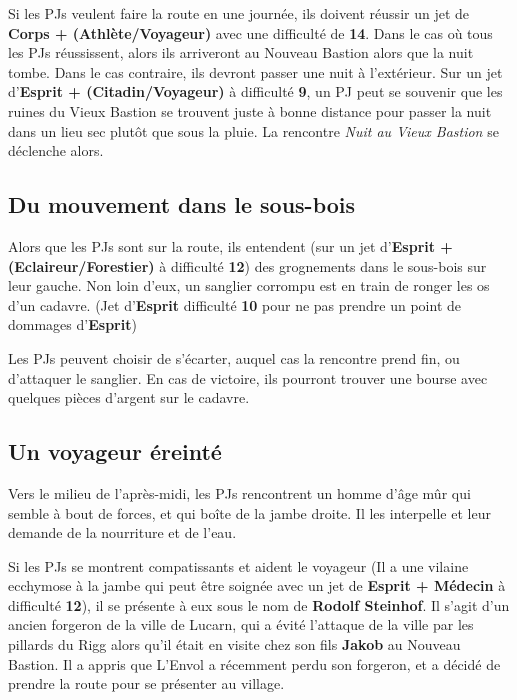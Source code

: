 \documentclass[10pt,twoside,twocolumn,openany,bg=print,justified]{dndbook}
\begin{document}
Si les PJs veulent faire la route en une journée, ils doivent réussir un jet de \textbf{Corps + (Athlète/Voyageur)} avec une difficulté de \textbf{14}. Dans le cas où tous les PJs réussissent, alors ils arriveront au Nouveau Bastion alors que la nuit tombe. Dans le cas contraire, ils devront passer une nuit à l'extérieur. Sur un jet d'\textbf{Esprit + (Citadin/Voyageur)} à difficulté \textbf{9}, un PJ peut se souvenir que les ruines du Vieux Bastion se trouvent juste à bonne distance pour passer la nuit dans un lieu sec plutôt que sous la pluie. La rencontre \textit{Nuit au Vieux Bastion} se déclenche alors.

\subsection*{Du mouvement dans le sous-bois}

Alors que les PJs sont sur la route, ils entendent (sur un jet d'\textbf{Esprit + (Eclaireur/Forestier)} à difficulté \textbf{12}) des grognements dans le sous-bois sur leur gauche. Non loin d'eux, un sanglier corrompu est en train de ronger les os d'un cadavre. (Jet d'\textbf{Esprit} difficulté \textbf{10} pour ne pas prendre un point de dommages d'\textbf{Esprit})

Les PJs peuvent choisir de s'écarter, auquel cas la rencontre prend fin, ou d'attaquer le sanglier. En cas de victoire, ils pourront trouver une bourse avec quelques pièces d'argent sur le cadavre.

\subsection*{Un voyageur éreinté}

Vers le milieu de l'après-midi, les PJs rencontrent un homme d'âge mûr qui semble à bout de forces, et qui boîte de la jambe droite. Il les interpelle et leur demande de la nourriture et de l'eau.

Si les PJs se montrent compatissants et aident le voyageur (Il a une vilaine ecchymose à la jambe qui peut être soignée avec un jet de \textbf{Esprit + Médecin} à difficulté \textbf{12}), il se présente à eux sous le nom de \textbf{Rodolf Steinhof}. Il s'agit d'un ancien forgeron de la ville de Lucarn, qui a évité l'attaque de la ville par les pillards du Rigg alors qu'il était en visite chez son fils \textbf{Jakob} au Nouveau Bastion. Il a appris que L'Envol a récemment perdu son forgeron, et a décidé de prendre la route pour se présenter au village.
\end{document}

